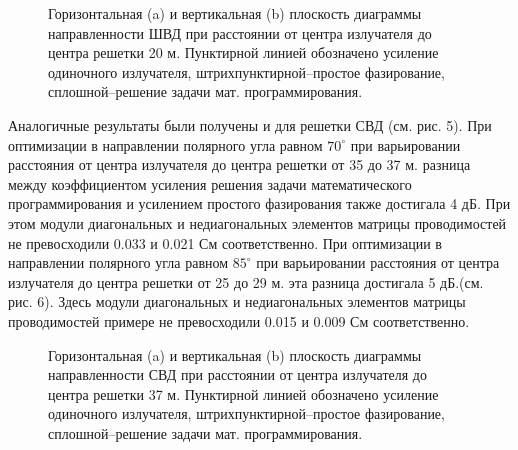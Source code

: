 \begin{figure}
\begin{minipage}[h]{0.49\linewidth}
\end{minipage}
\hfill
\begin{minipage}[h]{0.49\linewidth}
\end{minipage}
\caption{Горизонтальная (a) и вертикальная (b) плоскость диаграммы направленности ШВД при расстоянии от центра излучателя до центра решетки 20 м. Пунктирной линией обозначено усиление одиночного излучателя, штрихпунктирной--простое фазирование, сплошной--решение задачи мат. программирования.}
\label{ris:bve_mut}
\end{figure}

Аналогичные результаты были получены и для решетки СВД (см. рис. 5). При оптимизации в направлении полярного угла равном $70^{\circ}$ при варьировании расстояния от центра излучателя до центра решетки от 35 до 37 м. разница между коэффициентом усиления решения задачи математического программирования и усилением простого фазирования также достигала 4 дБ. При этом модули диагональных и недиагональных элементов матрицы проводимостей не превосходили 0.033 и 0.021 См соответственно.  При оптимизации в направлении полярного угла равном $85^{\circ}$ при варьировании расстояния от центра излучателя до центра решетки от 25 до 29 м. эта разница достигала 5 дБ.(см. рис. 6). Здесь модули диагональных и недиагональных элементов матрицы проводимостей примере не превосходили 0.015 и 0.009 См соответственно.

\begin{figure}
\begin{minipage}[h]{0.49\linewidth}
\end{minipage}
\hfill
\begin{minipage}[h]{0.49\linewidth}
\end{minipage}
\caption{Горизонтальная (a) и вертикальная (b) плоскость диаграммы направленности СВД при расстоянии от центра излучателя до центра решетки 37 м. Пунктирной линией обозначено усиление одиночного излучателя, штрихпунктирной--простое фазирование, сплошной--решение задачи мат. программирования.}
\label{ris:bve_mut}
\end{figure}

